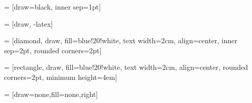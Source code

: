 \usepackage{tikz}
\usetikzlibrary{shapes,decorations,arrows}
\usetikzlibrary{positioning}

\usepackage{xcolor} %

 = [draw=black, inner sep=1pt]
\newlength{\fnodewidth} %
\setlength{\fnodewidth}{6cm}

 = [draw, -latex]

 = [diamond, draw, fill=blue!20!white, text width=2cm,
    align=center, inner sep=2pt, rounded corners=2pt]

 = [rectangle, draw, fill=blue!20!white, text width=2cm,
    align=center, rounded corners=2pt, minimum height=4em]
    
 = [draw=none,fill=none,right]

%
%
%
\newcommand{\funcnode}[4]{
    \node [funcnode, #1] (#2) {
        \begin{minipage}{\fnodewidth}
            \begin{tabular}{l}
                \rowcolor[gray]{0.8}
                \begin{minipage}[c]{\textwidth - 2\tabcolsep}
                    \singlespacing
                    \begin{center}
                        \vspace{-\baselineskip}
                        \textbf{#3}
                    \end{center}
                \end{minipage}\\
                \begin{minipage}[c]{\textwidth - 2\tabcolsep}
                    \singlespacing
                    \begin{minipage}[c]{\textwidth - 2\tabcolsep}
                    #4
                    \end{minipage}
                    \vspace{0.5\baselineskip}\\
                \end{minipage}\\
            \end{tabular}
        \end{minipage}
    } %
} %
